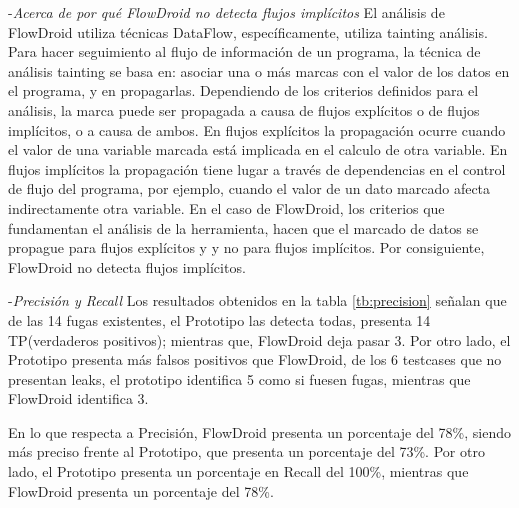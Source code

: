 -\textit{Acerca de por qué FlowDroid no detecta flujos implícitos}\newline
El análisis de FlowDroid utiliza técnicas DataFlow, específicamente, utiliza
tainting análisis. Para hacer seguimiento al flujo de información de un
programa, la técnica de análisis tainting se basa en: asociar una o más marcas
con el valor de los datos en el programa, y en propagarlas. Dependiendo de los
criterios definidos para el análisis, la marca puede ser propagada a causa de
flujos explícitos o de flujos implícitos, o a causa de ambos. En flujos
explícitos la propagación ocurre cuando el valor de una variable marcada está
implicada en el calculo de otra variable. En flujos implícitos la propagación
tiene lugar a través de dependencias en el control de flujo del programa, por
ejemplo, cuando el valor de un dato marcado afecta indirectamente otra variable.\newline 
En el caso de FlowDroid, los criterios que fundamentan el análisis de la
herramienta, hacen que el marcado de datos se propague para flujos explícitos y
y no para flujos implícitos. Por consiguiente, FlowDroid no detecta flujos
implícitos.


-\textit{Precisión y Recall}\newline
Los resultados obtenidos en la tabla \ref{tb:precision} señalan que de las 14
fugas existentes, el Prototipo las detecta todas, presenta 14 TP(verdaderos
positivos); mientras que, FlowDroid deja pasar 3.\newline
Por otro lado, el Prototipo presenta más falsos positivos que FlowDroid, de los
6 testcases que no presentan leaks, el prototipo identifica 5 como si fuesen
fugas, mientras que FlowDroid identifica 3.

En lo que respecta a Precisión, FlowDroid presenta un porcentaje del 78\%,
siendo más preciso frente al Prototipo, que presenta un porcentaje del
73\%.\newline 
Por otro lado, el Prototipo presenta un porcentaje en Recall del 100\%,
mientras que FlowDroid presenta un porcentaje del 78\%.

